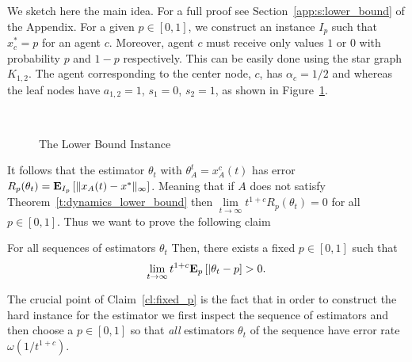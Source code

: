We sketch here the main idea. For a full proof see Section~\ref{app:s:lower_bound}
of the Appendix.  For a given $p \in [0,1]$, we construct an instance $I_p$ such that
$x_c^*=p$ for an agent $c$. Moreover, agent $c$ must
receive only values $1$ or $0$ with probability $p$ and $1-p$ respectively.
This can be easily done using the star graph $K_{1,2}$.
The agent corresponding to the center node, $c$, has $\alpha_c = 1/2$ and
whereas the leaf nodes have $a_{1,2} = 1$, $s_1 = 0$, $s_2 = 1$,
as shown in Figure~\ref{fig:lb_instance}.
%
\begin{figure}\
  \centering

  \caption{The Lower Bound Instance} \label{fig:lb_instance}
\end{figure}
%
It follows that the estimator $\theta_t$ with $\theta_A^t = x_A^c(t)$
has error $R_p(\theta_t)=\bm{\mathrm{E}}_{I_p} \left[ \| x_A(t)-x^* \|_{\infty} \right]$.
Meaning that if $A$ does not satisfy Theorem~\ref{t:dynamics_lower_bound}
then $\lim\limits_{t \rightarrow \infty}t^{1+c}R_p(\theta_t)=0$ for all
$p \in [0,1]$. Thus we want to prove the following claim
\begin{claim}\label{cl:fixed_p}
  For all sequences of estimators $\theta_t$
  Then, there exists a fixed $p \in [0,1]$ such that
  \[
    \lim_{t \to \infty} t^{1+c} \bm{\mathrm{E}}_{p} \left[ |\theta_t - p \right] > 0.
  \]
\end{claim}
The crucial point of Claim~\ref{cl:fixed_p} is the fact that
in order to construct the hard instance for the estimator
we first inspect the sequence of estimators and then choose
a $p \in [0,1]$ so that \emph{all} estimators $\theta_t$ of
the sequence have error rate $\omega(1/t^{1+c})$.

